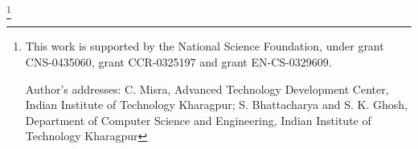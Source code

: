 \documentclass[format=acmsmall, review=false, screen=true, table]{acmart}
\begin{document}

%
%




\thanks{This work is supported by the National Science Foundation,
  under grant CNS-0435060, grant CCR-0325197 and grant EN-CS-0329609.

  Author's addresses: C. Misra, Advanced Technology Development Center, Indian Institute of Technology Kharagpur; S. Bhattacharya {and} S. K. Ghosh, Department of Computer Science and Engineering, Indian Institute of Technology Kharagpur}


\maketitle

\renewcommand{\shortauthors}{C. Misra et al.}


\end{document}

